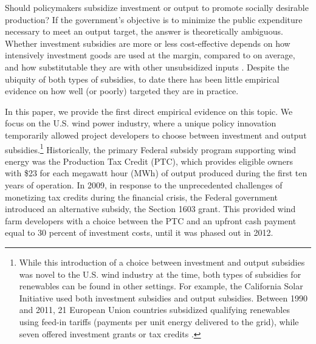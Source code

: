 \documentclass[12pt]{article}
\begin{document}
Should policymakers subsidize investment or output to promote socially desirable production? If the government's objective is to minimize the public expenditure necessary to meet an output target, the answer is theoretically ambiguous. Whether investment subsidies are more or less cost-effective depends on how intensively investment goods are used at the margin, compared to on average, and how substitutable they are with other unsubsidized inputs \citep{parish_relative_1982}. Despite the ubiquity of both types of subsidies, to date there has been little empirical evidence on how well (or poorly) targeted they are in practice. 

In this paper, we provide the first direct empirical evidence on this topic. We focus on the U.S. wind power industry, where a unique policy innovation temporarily allowed project developers to choose between investment and output subsidies.\footnote{While this introduction of a choice between investment and output subsidies was novel to the U.S. wind industry at the time, both types of subsidies for renewables can be found in other settings. For example, the California Solar Initiative used both investment subsidies and output subsidies. Between 1990 and 2011, 21 European Union countries subsidized qualifying renewables using feed-in tariffs (payments per unit energy delivered to the grid), while seven offered investment grants or tax credits \citep{JENNER2013385}.} Historically, the primary Federal subsidy program supporting wind energy was the Production Tax Credit (PTC), which provides eligible owners with \$23 for each megawatt hour (MWh) of output produced during the first ten years of operation. In 2009, in response to the unprecedented challenges of monetizing tax credits during the financial crisis, the Federal government introduced an alternative subsidy, the Section 1603 grant. This provided wind farm developers with a choice between the PTC and an upfront cash payment equal to 30 percent of investment costs, until it was phased out in 2012. 
\end{document}
